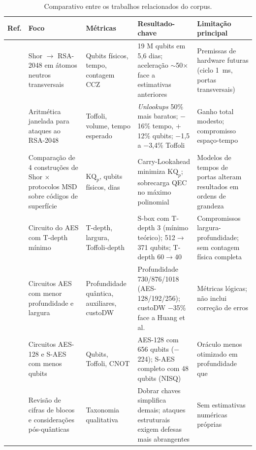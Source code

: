 \documentclass[11pt,a4paper]{article}
\begin{document}
\begin{table}[H]
\centering
\caption{Comparativo entre os trabalhos relacionados do corpus.}
\label{tab:relacionados}
\footnotesize
\begin{tabularx}{\textwidth}{c Y Y Y Y}
\toprule
\textbf{Ref.} & \textbf{Foco} & \textbf{Métricas} & \textbf{Resultado-chave} & \textbf{Limitação principal} \\
\midrule
\cite{zhou2025} & Shor $\rightarrow$ RSA-2048 em átomos neutros transversais & Qubits físicos, tempo, contagem CCZ & 19 M qubits em 5,6 dias; aceleração $\sim$50$\times$ face a estimativas anteriores & Premissas de hardware futuras (ciclo 1~ms, portas transversais) \\
\addlinespace
\cite{luongo2025} & Aritmética janelada para ataques ao RSA-2048 & Toffoli, volume, tempo esperado & \emph{Unlookups} 50\% mais baratos; $-$16\% tempo, $+$12\% qubits; $-$1,5 a $-$3,4\% Toffoli & Ganho total modesto; compromisso espaço-tempo \\
\addlinespace
\cite{oonishi2026} & Comparação de 4 construções de Shor $\times$ protocolos MSD sobre códigos de superfície & $\mathrm{KQ}_p$, qubits físicos, dias & Carry-Lookahead minimiza $\mathrm{KQ}_p$; sobrecarga QEC no máximo polinomial & Modelos de tempos de portas alteram resultados em ordens de grandeza \\
\addlinespace
\cite{huang2022} & Circuito do AES com T-depth mínimo & T-depth, largura, Toffoli-depth & S-box com T-depth 3 (mínimo teórico); 512$\rightarrow$371 qubits; T-depth 60$\rightarrow$40 & Compromissos largura-profundidade; sem contagem física completa \\
\addlinespace
\cite{liu2023} & Circuitos AES com menor profundidade e largura & Profundidade quântica, auxiliares, custoDW & Profundidade 730/876/1018 (AES-128/192/256); custoDW $-$35\% face a Huang et al. & Métricas lógicas; não inclui correção de erros \\
\addlinespace
\cite{wang2022} & Circuitos AES-128 e S-AES com menos qubits & Qubits, Toffoli, CNOT & AES-128 com 656 qubits ($-$224); S-AES completo com 48 qubits (NISQ) & Oráculo menos otimizado em profundidade que~\cite{liu2023} \\
\addlinespace
\cite{chethana2025} & Revisão de cifras de blocos e considerações pós-quânticas & Taxonomia qualitativa & Dobrar chaves simplifica demais; ataques estruturais exigem defesas mais abrangentes & Sem estimativas numéricas próprias \\
\bottomrule
\end{tabularx}
\end{table}
\end{document}
